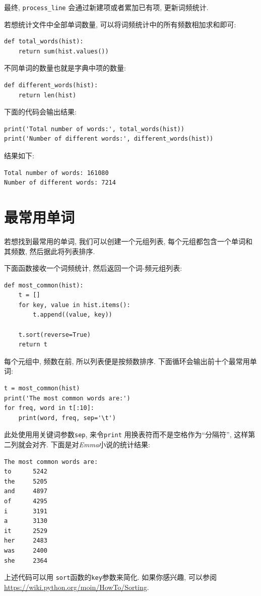 \documentclass[10pt]{book}
\begin{document}
最终, \verb"process_line" 会通过新建项或者累加已有项, 更新词频统计.

若想统计文件中全部单词数量, 可以将词频统计中的所有频数相加求和即可:

\begin{verbatim}
def total_words(hist):
    return sum(hist.values())
\end{verbatim}
%
不同单词的数量也就是字典中项的数量:

\begin{verbatim}
def different_words(hist):
    return len(hist)
\end{verbatim}
%
下面的代码会输出结果:

\begin{verbatim}
print('Total number of words:', total_words(hist))
print('Number of different words:', different_words(hist))
\end{verbatim}
%
结果如下:

\begin{verbatim}
Total number of words: 161080
Number of different words: 7214
\end{verbatim}
%

\section{最常用单词}

若想找到最常用的单词, 我们可以创建一个元组列表, 
每个元组都包含一个单词和其频数, 然后据此将列表排序.

下面函数接收一个词频统计, 然后返回一个词-频元组列表:

\begin{verbatim}
def most_common(hist):
    t = []
    for key, value in hist.items():
        t.append((value, key))

    t.sort(reverse=True)
    return t
\end{verbatim}

每个元组中, 频数在前, 所以列表便是按频数排序. 
下面循环会输出前十个最常用单词:

\begin{verbatim}
t = most_common(hist)
print('The most common words are:')
for freq, word in t[:10]:
    print(word, freq, sep='\t')
\end{verbatim}
%
此处使用用关键词参数{\tt sep}, 来令{\tt print} 用换表符而不是空格作为``分隔符'', 
这样第二列就会对齐.  下面是对{\em Emma}小说的统计结果:

\begin{verbatim}
The most common words are:
to      5242
the     5205
and     4897
of      4295
i       3191
a       3130
it      2529
her     2483
was     2400
she     2364
\end{verbatim}
%
上述代码可以用 {\tt sort}函数的{\tt key}参数来简化. 
如果你感兴趣, 可以参阅 \url{https://wiki.python.org/moin/HowTo/Sorting}.
\end{document}
